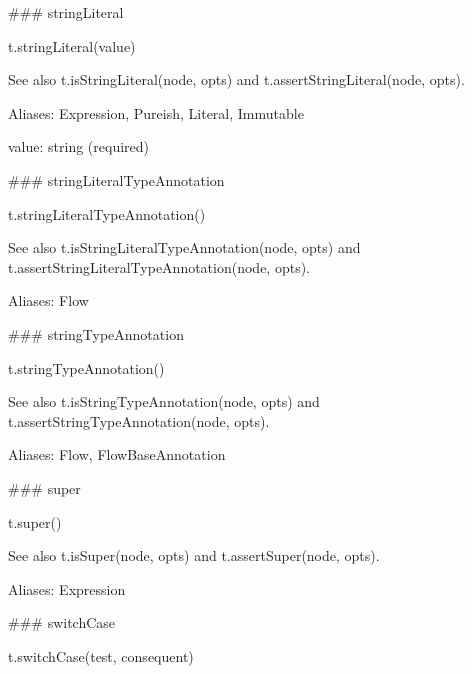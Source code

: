 \#\#\# string\+Literal 
\begin{DoxyCode}
t.stringLiteral(value)
\end{DoxyCode}


See also {\ttfamily t.\+is\+String\+Literal(node, opts)} and {\ttfamily t.\+assert\+String\+Literal(node, opts)}.

Aliases\+: {\ttfamily Expression}, {\ttfamily Pureish}, {\ttfamily Literal}, {\ttfamily Immutable}


\begin{DoxyItemize}
\item {\ttfamily value}\+: {\ttfamily string} (required) 


\end{DoxyItemize}

\#\#\# string\+Literal\+Type\+Annotation 
\begin{DoxyCode}
t.stringLiteralTypeAnnotation()
\end{DoxyCode}


See also {\ttfamily t.\+is\+String\+Literal\+Type\+Annotation(node, opts)} and {\ttfamily t.\+assert\+String\+Literal\+Type\+Annotation(node, opts)}.

Aliases\+: {\ttfamily Flow}





\#\#\# string\+Type\+Annotation 
\begin{DoxyCode}
t.stringTypeAnnotation()
\end{DoxyCode}


See also {\ttfamily t.\+is\+String\+Type\+Annotation(node, opts)} and {\ttfamily t.\+assert\+String\+Type\+Annotation(node, opts)}.

Aliases\+: {\ttfamily Flow}, {\ttfamily Flow\+Base\+Annotation}





\#\#\# super 
\begin{DoxyCode}
t.super()
\end{DoxyCode}


See also {\ttfamily t.\+is\+Super(node, opts)} and {\ttfamily t.\+assert\+Super(node, opts)}.

Aliases\+: {\ttfamily Expression}





\#\#\# switch\+Case 
\begin{DoxyCode}
t.switchCase(test, consequent)
\end{DoxyCode}


